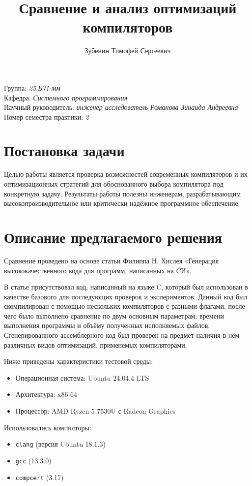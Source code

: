 \documentclass[a4paper]{article}
\title{Сравнение и анализ оптимизаций компиляторов}
\author{Зубенин Тимофей Сергеевич}
\date{}
\begin{document}
\maketitle

\begin{flushright}
    Группа: \emph{25.Б71-мм} \\
    Кафедра: \emph{Системного программирования} \\
    Научный руководитель: \emph{инженер-исследователь Романова Зинаида Андреевна} \\
    Номер семестра практики: \emph{2}
\end{flushright}

\section{Постановка задачи}
Целью работы является проверка возможностей современных компиляторов и их оптимизационных стратегий для обоснованного выбора компилятора под конкретную задачу. Результаты работы полезны инженерам, разрабатывающим высокопроизводительное или критически надёжное программное обеспечение.
\bigskip
\section{Описание предлагаемого решения}
\noindent
Сравнение проведено на основе статьи Филиппа Н. Хислея «Генерация высококачественного кода для программ, написанных на CИ».

В статье присутствовал код, написанный на языке C, который был использован в качестве базового для последующих проверок и экспериментов. Данный код был скомпилирован с помощью нескольких компиляторов с разными флагами, после чего было выполнено сравнение по двум основным параметрам: времени выполнения программы и объёму полученных исполняемых файлов. Сгенерированного ассемблерного код был проверен на предмет наличия в нём различных видов оптимизаций, применемых компиляторами.

\bigskip
\noindent
Ниже приведены характеристики тестовой среды:
\begin{itemize}
    \item Операционная система: Ubuntu 24.04.4 LTS
    \item Архитектура: x86-64
    \item Процессор: AMD Ryzen 5 7530U с Radeon Graphics
\end{itemize}

\medskip
\noindent
Использовались компилторы:
\begin{itemize}
    \item \texttt{clang} (версия Ubuntu 18.1.3)
    \item \texttt{gcc} (13.3.0)
    \item \texttt{compcert} (3.17)
\end{itemize}
\end{document}
